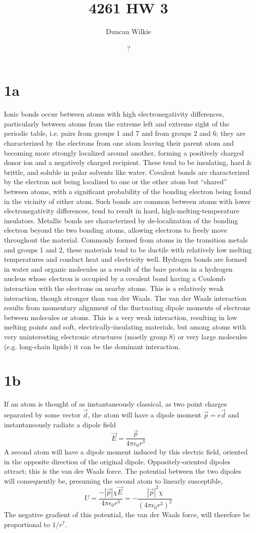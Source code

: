 \documentclass{article}
\title{4261 HW 3}
\author{Duncan Wilkie}
\date{?}
\begin{document}
\maketitle

\section*{1a}
Ionic bonds occur between atoms with high electronegativity differences,
particularly between atoms from the extreme left and extreme right of the periodic table,
i.e. pairs from groups 1 and 7 and from groups 2 and 6;
they are characterized by the electrons from one atom leaving their parent atom and becoming more strongly localized around another,
forming a positively charged donor ion and a negatively charged recipient.
These tend to be insulating, hard \& brittle, and soluble in polar solvents like water.
Covalent bonds are characterized by the electron not being localized to one or the other atom but ``shared'' between atoms,
with a significant probability of the bonding electron being found in the vicinity of either atom.
Such bonds are common between atoms with lower electronegativity differences, tend to result in hard, high-melting-temperature insulators.
Metallic bonds are characterized by de-localization of the bonding electron beyond the two bonding atoms,
allowing electrons to freely move throughout the material.
Commonly formed from atoms in the transition metals and groups 1 and 2, these materials tend to be ductile with relatively low
melting temperatures and conduct heat and electricity well.
Hydrogen bonds are formed in water and organic molecules as a result of the bare proton in a hydrogen nucleus whose electron is occupied by
a covalent bond having a Coulomb interaction with the electrons on nearby atoms. This is a relatively weak interaction,
though stronger than van der Waals.
The van der Waals interaction results from momentary alignment of the fluctuating dipole moments of electrons between molecules or atoms.
This is a very weak interaction, resulting in low melting points and soft, electrically-insulating materials, but among atoms with
very uninteresting electronic structures (mostly group 8) or very large molecules (e.g. long-chain lipids) it can be the dominant
interaction.

\section*{1b}
If an atom is thought of as instantaneously classical, as two point charges separated by some vector $\vec{d}$,
the atom will have a dipole moment $\vec{p}=e\vec{d}$ and instantaneously radiate a dipole field
\[\vec{E}=\frac{\vec{p}}{4\pi\epsilon_{0}r^{3}}\]
A second atom will have a dipole moment induced by this electric field, oriented in the opposite direction of the original dipole.
Oppositely-oriented dipoles attract; this is the van der Waals force.
The potential between the two dipoles will consequently be, presuming the second atom to linearly susceptible,
\[U=\frac{-|\vec{p}|\chi\vec{E}}{4\pi\epsilon_{0}r^{3}}=-\frac{|\vec{p}|^{2}\chi}{(4\pi\epsilon_{0}r^{3})^{2}}\]
The negative gradient of this potential, the van der Waals force, will therefore be proportional to $1/r^{7}$.
\end{document}
